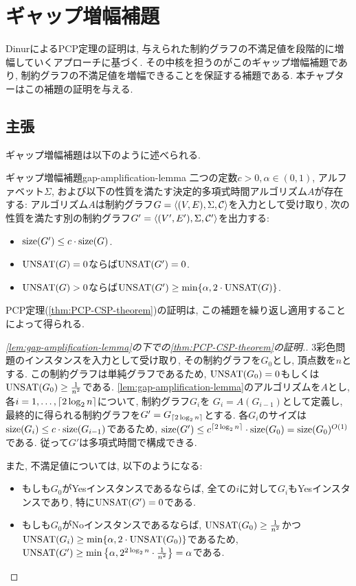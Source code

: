 \chapter{ギャップ増幅補題} \label{chap:gap-amplification}

DinurによるPCP定理の証明は, 与えられた制約グラフの不満足値を段階的に増幅していくアプローチに基づく.
その中核を担うのがこのギャップ増幅補題であり, 制約グラフの不満足値を増幅できることを保証する補題である.
本チャプターはこの補題の証明を与える.

\section{主張}
ギャップ増幅補題は以下のように述べられる.

\begin{lemma}{ギャップ増幅補題}{gap-amplification-lemma}
  二つの定数$c>0,\alpha\in (0,1)$, アルファベット$\Sigma$, および以下の性質を満たす決定的多項式時間アルゴリズム$A$が存在する: 
  アルゴリズム$A$は制約グラフ$G=\langle(V,E),\Sigma,\mathcal{C}\rangle$を入力として受け取り, 次の性質を満たす別の制約グラフ$G'=\langle(V',E'),\Sigma,\mathcal{C}'\rangle$を出力する:
  \begin{itemize}
    \item $\mathrm{size}(G')\le c\cdot \mathrm{size}(G)$.
    \item $\mathrm{UNSAT}(G)=0$ならば$\mathrm{UNSAT}(G')=0$.
    \item $\mathrm{UNSAT}(G)>0$ならば$\mathrm{UNSAT}(G')\ge \min\{\alpha, 2\cdot \mathrm{UNSAT}(G)\}$.
  \end{itemize}
\end{lemma}

PCP定理(\cref{thm:PCP-CSP-theorem})の証明は, この補題を繰り返し適用することによって得られる.

\begin{proof}[\cref{lem:gap-amplification-lemma}の下での\cref{thm:PCP-CSP-theorem}の証明.]
  3彩色問題のインスタンスを入力として受け取り, その制約グラフを$G_0$とし, 頂点数を$n$とする.
  この制約グラフは単純グラフであるため, $\mathrm{UNSAT}(G_0)=0$もしくは$\mathrm{UNSAT}(G_0)\ge \frac{1}{n^2}$である.
  \cref{lem:gap-amplification-lemma}のアルゴリズムを$A$とし, 各$i=1,\dots,\lceil2\log_2 n\rceil$について, 制約グラフ$G_i$を
  $G_i = A(G_{i-1})$として定義し, 最終的に得られる制約グラフを$G'=G_{\lceil2\log_2 n\rceil}$とする.
  各$G_i$のサイズは$\mathrm{size}(G_i) \le c\cdot \mathrm{size}(G_{i-1})$であるため, $\mathrm{size}(G')\le c^{\lceil2\log_2 n\rceil}\cdot \mathrm{size}(G_0)=\mathrm{size}(G_0)^{O(1)}$である.
  従って$G'$は多項式時間で構成できる.

  また, 不満足値については, 以下のようになる:
  \begin{itemize}
  \item もしも$G_0$がYesインスタンスであるならば, 全ての$i$に対して$G_i$もYesインスタンスであり, 特に$\mathrm{UNSAT}(G')=0$である.
  \item もしも$G_0$がNoインスタンスであるならば, $\mathrm{UNSAT}(G_0)\ge \frac{1}{n^2}$かつ$\mathrm{UNSAT}(G_i)\ge \min\{\alpha, 2\cdot \mathrm{UNSAT}(G_0)\}$であるため, $\mathrm{UNSAT}(G')\ge \min\qty{\alpha, 2^{2\log_2 n}\cdot \frac{1}{n^2}}=\alpha$である.
  \end{itemize}
\end{proof}

